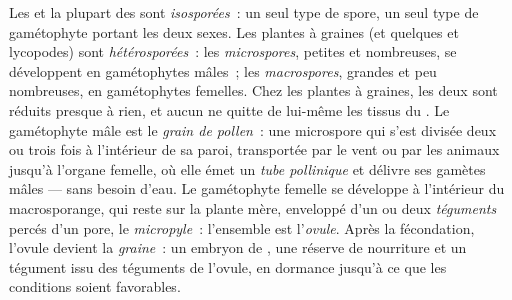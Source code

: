 \begin{definition}\label{def:b2:plant-life-cycles:heterospory}
Les  et la plupart des  sont \emph{isosporées}~: un seul
type de spore, un seul type de gamétophyte portant les deux sexes. Les
plantes à graines (et quelques  et lycopodes) sont
\emph{hétérosporées}~: les \emph{microspores}, petites et nombreuses,
se développent en gamétophytes mâles~; les \emph{macrospores}, grandes
et peu nombreuses, en gamétophytes femelles. Chez les plantes à graines,
les deux sont réduits presque à rien, et aucun ne quitte de lui-même les
tissus du . Le gamétophyte mâle est le \emph{grain de
pollen}~: une microspore qui s'est divisée deux ou trois fois à
l'intérieur de sa paroi, transportée par le vent ou par les animaux
jusqu'à l'organe femelle, où elle émet un \emph{tube pollinique} et
délivre ses gamètes mâles --- sans besoin d'eau. Le gamétophyte femelle
se développe à l'intérieur du macrosporange, qui reste sur la plante
mère, enveloppé d'un ou deux \emph{téguments} percés d'un pore, le
\emph{micropyle}~: l'ensemble est l'\emph{ovule}. Après la fécondation,
l'ovule devient la \emph{graine}~: un embryon de , une réserve
de nourriture et un tégument issu des téguments de l'ovule, en
dormance jusqu'à ce que les conditions soient favorables.
\end{definition}

